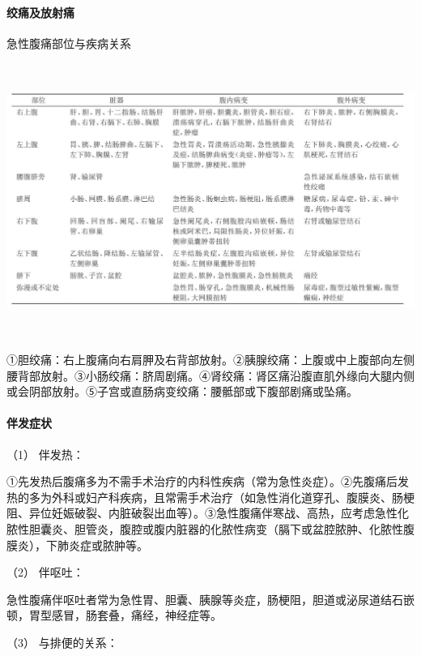 \paragraph{绞痛及放射痛}

\begin{table}[htbp]
\centering
\caption{急性腹痛部位与疾病关系}
\label{tab10-2}
\includegraphics[width=6.71875in,height=3.52083in]{./images/Image00051.jpg}
\end{table}

①胆绞痛：右上腹痛向右肩胛及右背部放射。②胰腺绞痛：上腹或中上腹部向左侧腰背部放射。③小肠绞痛：脐周剧痛。④肾绞痛：肾区痛沿腹直肌外缘向大腿内侧或会阴部放射。⑤子宫或直肠病变绞痛：腰骶部或下腹部剧痛或坠痛。

\paragraph{伴发症状}

\hypertarget{text00026.htmlux5cux23CHP1-10-2-1-4-3-1}{}
（1） 伴发热：

①先发热后腹痛多为不需手术治疗的内科性疾病（常为急性炎症）。②先腹痛后发热的多为外科或妇产科疾病，且常需手术治疗（如急性消化道穿孔、腹膜炎、肠梗阻、异位妊娠破裂、内脏破裂出血等）。③急性腹痛伴寒战、高热，应考虑急性化脓性胆囊炎、胆管炎，腹腔或腹内脏器的化脓性病变（膈下或盆腔脓肿、化脓性腹膜炎），下肺炎症或脓肿等。

\hypertarget{text00026.htmlux5cux23CHP1-10-2-1-4-3-2}{}
（2） 伴呕吐：

急性腹痛伴呕吐者常为急性胃、胆囊、胰腺等炎症，肠梗阻，胆道或泌尿道结石嵌顿，胃型感冒，肠套叠，痛经，神经症等。

\hypertarget{text00026.htmlux5cux23CHP1-10-2-1-4-3-3}{}
（3） 与排便的关系：

